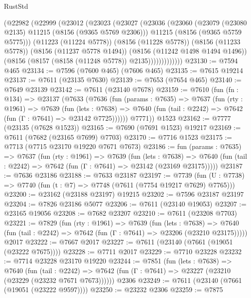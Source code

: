 \begin{lexlean}{RustStd}
\begin{coremodule}
              (@22982
                (@22999
                  (@23012
                    (@23023
                      (@23027
                        (@23036
                          (@23060
                            (@23079 (@23080 @2135) @11215 (@8156 (@9365 @5769 @2306)))
                            @11215
                            (@8156 (@9365 @5759 @5775)))
                          (@11223 (@11224 @5778))
                          (@8156 (@11228 @5778))
                          (@8156 (@11233 @5778))
                          (@8156 (@11237 @5778 @1494))
                          (@8156 (@11242 @1498 @1494 @1496))
                          (@8156 (@8157 (@8158 (@11248 @5778)) @2135)))))))))))))
@23130 := @7594 @465
@23134 := @7596 (@7600 @465) (@7606 @465)
@23135 := @7615 @19214
@23137 := @7611 (@23135 @7630)
@23139 := @7653 (@7654 @465)
@23140 := @7649 @23139
@23142 := @7611 (@23140 @7678)
@23159 := @7610
    (fun (fn : @134) =>
    @23137
      (@7633
        (@7636
          (fun (params : @7635) =>
          @7637
            (fun (rty : @1961) =>
            @7639
              (fun (lets : @7638) =>
              @7640 (fun (tail : @2242) => @7642 (fun (Γ : @7641) => @23142 @7725))))))
        @7771))
    @1523
@23162 := @7777 (@23135 (@7628 @1523))
@23165 := @7690 (@7691 @1523) @19217
@23169 := @7611 (@7682 (@23165 @7699) @7703)
@23170 := @7716 @1523
@23175 := @7713 (@7715 @23170 @19220 @7671 @7673)
@23186 := fun (params : @7635) =>
  @7637
    (fun (rty : @1961) =>
    @7639
      (fun (lets : @7638) =>
      @7640 (fun (tail : @2242) => @7642 (fun (Γ : @7641) => @23142 (@23169 @23175)))))
@23187 := @7636 @23186
@23188 := @7633 @23187
@23197 := @7739
    (fun (U : @7738) => @7740 (fun (t : @7) => @7748 (@7611 (@7754 @19217 @7629) @7765)))
@23200 := @23162 (@23188 @23197) @19215
@23202 := @7596 @23187 @23197
@23204 := @7826 @23186 @5077
@23206 := @7611 (@23140 @19053)
@23207 := @23165 @19056
@23208 := @7682 @23207
@23210 := @7611 (@23208 @7703)
@23221 := @7829
    (fun (rty : @1961) =>
    @7639
      (fun (lets : @7638) =>
      @7640 (fun (tail : @2242) => @7642 (fun (Γ : @7641) => @23206 (@23210 @23175)))))
    @2017
@23222 := @7667 @2017
@23227 := @7611 (@23140 (@7661 (@19051 (@23222 @7675))))
@23228 := @7711 @2017
@23229 := @7710 @23228
@23232 := @7714 @23228 @23170 @19220
@23244 := @7851
    (fun (lets : @7638) =>
    @7640
      (fun (tail : @2242) =>
      @7642 (fun (Γ : @7641) => @23227 (@23210 (@23229 (@23232 @7671 @7673))))))
    @2306
@23249 := @7611 (@23140 (@7661 (@19051 (@23222 @9597))))
@23250 := @23232 @2306
@23259 := @7875

\end{coremodule}
\end{lexlean}
